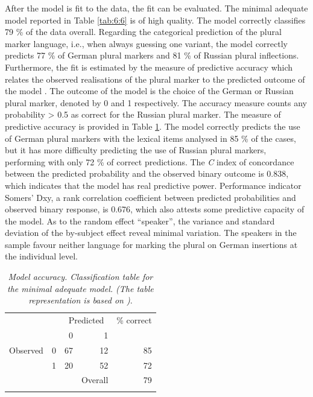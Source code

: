 After the model is fit to the data, the fit can be evaluated. The minimal adequate model reported in Table \ref{tab:6:6} is of high quality. The model correctly classifies 79 \% of the data overall. Regarding the categorical prediction of the plural marker language, i.e., when always guessing one variant, the model correctly predicts 77 \% of German plural markers and 81 \% of Russian plural inflections. Furthermore, the fit is estimated by the measure of predictive accuracy which relates the observed realisations of the plural marker to the predicted outcome of the model \citep{bresnan-etal}. The outcome of the model is the choice of the German or Russian plural marker, denoted by 0 and 1 respectively. The accuracy measure counts any probability >{} 0.5 as correct for the Russian plural marker. The measure of predictive accuracy is provided in Table \ref{tab:6:7}. The model correctly predicts the use of German plural markers with the lexical items analysed in 85 \% of the cases, but it has more difficulty predicting the use of Russian plural markers, performing with only 72 \% of correct predictions. The \textit{C} index of concordance between the predicted probability and the observed binary outcome is 0.838, which indicates that the model has real predictive power. Performance indicator Somers' Dxy, a rank correlation coefficient between predicted probabilities and observed binary response, is 0.676, which also attests some predictive capacity of the model. As to the random effect “speaker”, the variance and standard deviation of the by-subject effect reveal minimal variation. The speakers in the sample favour neither language for marking the plural on German insertions at the individual level.

\begin{table}
	\centering
	\begin{small}
		\begin{tabular} {p{2.5cm} p{1cm} r r r} \midrule
			\addlinespace[2mm] 
 			&& \multicolumn{2}{c}{Predicted} &\% correct\\ 
			\addlinespace[2mm]
 			\cline{3-4}
			\addlinespace[2mm]
			  & &0 &1 &\\ 
			\addlinespace[2mm]
			\midrule
			\addlinespace[2mm]
			Observed  & 0     &67   &12 &85\\
			 &1 &20 &52 &72\\
			 & & &Overall &79\\ \addlinespace[2mm] \midrule
		 \end{tabular}
		 \end{small}
		 \caption{\textit{Model accuracy. Classification table for the minimal adequate model. (The table representation is based on \cite{bresnan-etal})}.}
\label{tab:6:7}
\end{table}

